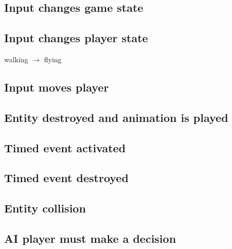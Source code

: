 \documentclass[12pt]{article}
\begin{document}
\subsection{Input changes game state}
\subsection{Input changes player state}
walking $\rightarrow$ flying
\subsection{Input moves player}
\subsection{Entity destroyed and animation is played}
\subsection{Timed event activated}
\subsection{Timed event destroyed}
\subsection{Entity collision}
\subsection{AI player must make a decision}
\end{document}
